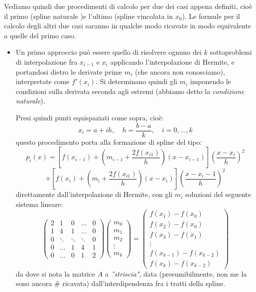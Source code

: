 \documentclass[a4paper,11pt]{article}
\begin{document}
Vediamo quindi due procedimenti di calcolo per due dei casi appena definiti, cioè il primo (spline naturale )e l'ultimo (spline vincolata in $x_0$).
Le formule per il calcolo degli altri due casi saranno in qualche modo ricavate in modo equivalente a quelle del primo caso.
\begin{itemize}
	\item Un primo approccio può essere quello di risolvere ognuno dei $k$ sottoproblemi di interpolazione fra $x_{i - 1}$ e $x_i$ applicando l'interpolazione di Hermite, e portandosi dietro le derivate prime $m_i$ (che ancora non conosciamo), interpretate come $f'(x_i)$.
		Si determinano quindi gli $m_i$ imponendo le condizioni sulla derivata seconda agli estremi (abbiamo detto la \textit{condizione naturale}).
	
		Presi quindi punti equispaziati come sopra, cioè:
		$$
		x_i = a + ih, \quad h = \frac{b - a}{k}, \quad i = 0, ..., k
		$$
		questo procedimento porta alla formazione di spline del tipo:
		$$
		p_i(x) = \left[ f(x_{i - 1}) + \left( m_{i - 1} + \frac{2 f(x_{i  1})}{h} \right) (x - x_{i - 1})  \right] \left( \frac{x - x_i}{h} \right)^2
		$$
		$$
		+ \left[ f(x_{i}) + \left( m_{i} + \frac{2 f(x_{i  1})}{h} \right) (x - x_{i})  \right] \left( \frac{x - x_i - 1}{h} \right)^2
		$$
		direttamente dall'interpolazione di Hermite, con gli $m_i$ soluzioni del seguente sistema lineare:
		$$
		\begin{pmatrix}
			2 & 1 & 0 & ... & 0 \\ 
			1 & 4 & 1 & ... & 0 \\
			0 & \ddots & \ddots & \ddots & 0 \\
			0 & ... & 1 & 4 & 1 \\
			0 & ... & 0 & 1 & 2
		\end{pmatrix}
		\begin{pmatrix}
			m_0 \\ m_1 \\ m_2 \\ \vdots \\ m_k
		\end{pmatrix}
		=
		\begin{pmatrix}
			f(x_1) - f(x_0) \\
			f(x_2) - f(x_0) \\
			f(x_3) - f(x_1) \\
			\vdots \\
			f(x_{k-1}) - f(x_{k-2}) \\
			f(x_k) - f(x_{k-2})
		\end{pmatrix}
		$$
		da dove si nota la matrice $A$ a \textit{˝striscia"}, data (presumibilmente, non me la sono ancora # ricavata) dall'interdipendenza fra i tratti della spline.


\end{itemize}
\end{document}
